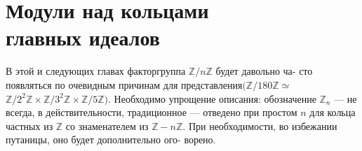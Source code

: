 \documentclass{mai_book}
\begin{document}
\chapter{Модули над кольцами\\главных идеалов}
\noindent В этой и следующих главах факторгруппа $\mathbb{Z}/n\mathbb{Z}$ будет давольно ча-\linebreak
сто появляться по очевидным причинам для представления$(\mathbb{Z}/180\mathbb{Z}\simeq$ \linebreak
 $\mathbb{Z}/2^2\mathbb{Z}\times \mathbb{Z}/3^2\mathbb{Z}\times \mathbb{Z}/5\mathbb{Z})$. Необходимо упрощение описания: обозначение \linebreak
  $\mathbb{Z}_n$ --- не всегда, в действительности, традиционное --- отведено при \linebreak простом $n$ для кольца частных из $\mathbb{Z}$ со знаменателем из $\mathbb{Z}-n\mathbb{Z}$. При \linebreak необходимости, во избежании путаницы, оно будет дополнительно ого- \linebreak ворено.  
\end{document}
